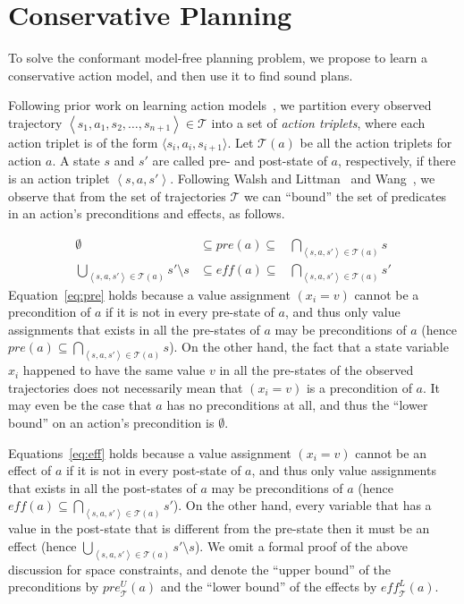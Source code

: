 \documentclass{article}
\newcommand{\tuple}[1]{\ensuremath{\left \langle #1 \right \rangle }}
\newcommand{\eff}{\textit{eff}}
\newcommand{\pre}{\textit{pre}}
\begin{document}
	
	\section{Conservative Planning}
	To solve the conformant model-free planning problem, we propose to learn a conservative action model, and then use it to find sound plans.
	
	Following prior work on learning action models~\cite{wang1995learning,wang1994learning,walsh2008efficientLearning}, we partition every observed trajectory $\tuple{s_1,a_1,s_2,\ldots,s_{n+1}}\in\mathcal{T}$ into a set of {\em action triplets}, where each action triplet is of the form $\langle s_i, a_i, s_{i+1}\rangle$. 
	Let $\mathcal{T}(a)$ be all the action triplets for action $a$. 
	A state $s$ and $s'$ are called pre- and post-state of $a$, respectively, if there is an action triplet $\tuple{s,a,s'}$. Following Walsh and Littman~ and Wang~, we observe that from the set of trajectories $\mathcal{T}$ we can ``bound'' the set of predicates in an action's preconditions and effects, as follows. 
	
	\begin{align}
	\emptyset & \subseteq \pre(a) \subseteq & \bigcap_{\tuple{s, a, s'}\in \mathcal{T}(a)} s \label{eq:pre} \\
	\bigcup_{\tuple{s, a, s'}\in \mathcal{T}(a)} s'\setminus s &
	\subseteq \eff(a) \subseteq &
	\bigcap_{\tuple{s, a, s'}\in \mathcal{T}(a)} s'
	\label{eq:eff}
	\end{align}
	Equation~\ref{eq:pre} holds because a value assignment $(x_i=v)$ cannot be a precondition of $a$ if it is not in every pre-state of $a$, and thus only value assignments that 
	exists in all the pre-states of $a$ may be preconditions of $a$ (hence $\pre(a)\subseteq \bigcap_{\tuple{s, a, s'}\in \mathcal{T}(a)} s$).     On the other hand, the fact that a state variable $x_i$ happened to have the same value $v$ in all the pre-states of the observed trajectories does not necessarily mean that $(x_i=v)$ is a precondition of $a$. It may even be the case that $a$ has no preconditions at all, and thus the ``lower bound'' on an action's precondition is $\emptyset$. 
	
	Equations~\ref{eq:eff} holds because a value assignment $(x_i=v)$ cannot be an effect of $a$ if it is not in every post-state of $a$, and thus only value assignments that 
	exists in all the post-states of $a$ may be preconditions of $a$ (hence $\eff(a)\subseteq \bigcap_{\tuple{s, a, s'}\in \mathcal{T}(a)} s'$). On the other hand, every variable that has a value in the post-state that is different from the pre-state then it must be an effect (hence $\bigcup_{\tuple{s, a, s'}\in \mathcal{T}(a)} s'\setminus s$).
	We omit a formal proof of the above discussion for space constraints, 
	and denote the ``upper bound'' of the preconditions by $\pre_\mathcal{T}^U(a)$ 
	and the ``lower bound'' of the effects by $\eff_\mathcal{T}^L(a)$. 
	
\end{document}
